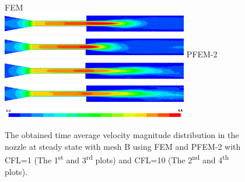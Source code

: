 \begin{figure}[htbp]
    \centering
    FEM\\
    \includegraphics[width=3.2in]{imgs/nozzle_pump/nozzle_fem_pm_cfl1.png}
    \includegraphics[width=3.2in]{imgs/nozzle_pump/nozzle_fem_pm_cfl10.png}
    PFEM-2\\
    \includegraphics[width=3.2in]{imgs/nozzle_pump/nozzle_pfem_pm_cfl1.png}
    \includegraphics[width=3.2in]{imgs/nozzle_pump/nozzle_pfem_pm_cfl10.png}
    \includegraphics[width=3.2in]{imgs/nozzle_pump/nozzle_legend.png}
    \caption{The obtained time average velocity magnitude distribution in the nozzle at steady state with mesh B using FEM and PFEM-2 with CFL=1 (The 1\textsuperscript{st} and 3\textsuperscript{rd} plots) and CFL=10 (The 2\textsuperscript{nd} and 4\textsuperscript{th} plots).}
    \label{fig:nozzlevelpm}
\end{figure}



